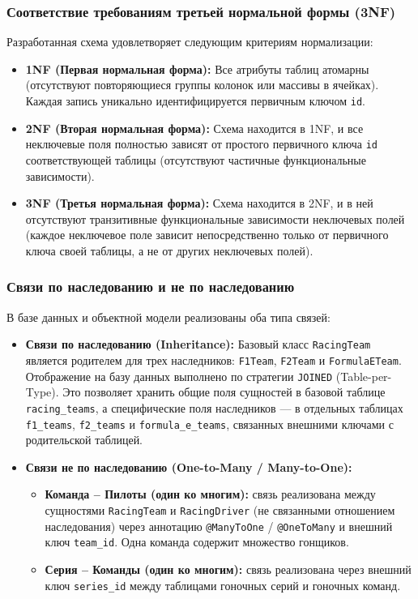 \documentclass[oneside,a4paper,14pt]{extarticle}
\begin{document}
\subsubsection*{Соответствие требованиям третьей нормальной формы (3NF)}
Разработанная схема удовлетворяет следующим критериям нормализации:
\begin{itemize}
  \item[--] \textbf{1NF (Первая нормальная форма):} Все атрибуты таблиц атомарны (отсутствуют повторяющиеся группы колонок или массивы в ячейках). Каждая запись уникально идентифицируется первичным ключом \texttt{id}.
  \item[--] \textbf{2NF (Вторая нормальная форма):} Схема находится в 1NF, и все неключевые поля полностью зависят от простого первичного ключа \texttt{id} соответствующей таблицы (отсутствуют частичные функциональные зависимости).
  \item[--] \textbf{3NF (Третья нормальная форма):} Схема находится в 2NF, и в ней отсутствуют транзитивные функциональные зависимости неключевых полей (каждое неключевое поле зависит непосредственно только от первичного ключа своей таблицы, а не от других неключевых полей).
\end{itemize}

\subsubsection*{Связи по наследованию и не по наследованию}
В базе данных и объектной модели реализованы оба типа связей:
\begin{itemize}
  \item[--] \textbf{Связи по наследованию (Inheritance):} Базовый класс \texttt{RacingTeam} является родителем для трех наследников: \texttt{F1Team}, \texttt{F2Team} и \texttt{FormulaETeam}. Отображение на базу данных выполнено по стратегии \texttt{JOINED} (Table-per-Type). Это позволяет хранить общие поля сущностей в базовой таблице \texttt{racing\_teams}, а специфические поля наследников — в отдельных таблицах \texttt{f1\_teams}, \texttt{f2\_teams} и \texttt{formula\_e\_teams}, связанных внешними ключами с родительской таблицей.
  \item[--] \textbf{Связи не по наследованию (One-to-Many / Many-to-One):}
  \begin{itemize}
    \item \textbf{Команда -- Пилоты (один ко многим):} связь реализована между сущностями \texttt{RacingTeam} и \texttt{RacingDriver} (не связанными отношением наследования) через аннотацию \texttt{@ManyToOne} / \texttt{@OneToMany} и внешний ключ \texttt{team\_id}. Одна команда содержит множество гонщиков.
    \item \textbf{Серия -- Команды (один ко многим):} связь реализована через внешний ключ \texttt{series\_id} между таблицами гоночных серий и гоночных команд.
  \end{itemize}
\end{itemize}
\end{document}

